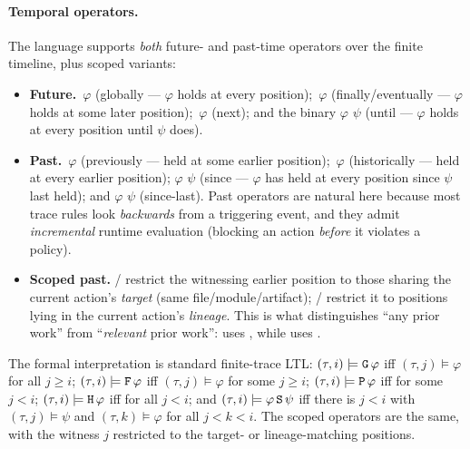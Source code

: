 \paragraph{Temporal operators.}
The language supports \emph{both} future- and past-time operators over the
finite timeline, plus scoped variants:
\begin{itemize}
\item \textbf{Future.} \,\(\varphi\) (globally --- \(\varphi\) holds at
every position); \,\(\varphi\) (finally/eventually --- \(\varphi\) holds
at some later position); \,\(\varphi\) (next); and the binary
\(\varphi\)\,\,\(\psi\) (until --- \(\varphi\) holds at every position
until \(\psi\) does).
\item \textbf{Past.} \,\(\varphi\) (previously --- held at some earlier
position); \,\(\varphi\) (historically --- held at every earlier
position); \(\varphi\)\,\,\(\psi\) (since --- \(\varphi\) has held at
every position since \(\psi\) last held); and \(\varphi\)\,\,\(\psi\)
(since-last). Past operators are natural here because most trace rules look
\emph{backwards} from a triggering event, and they admit \emph{incremental}
runtime evaluation (blocking an action \emph{before} it violates a policy).
\item \textbf{Scoped past.} / restrict the
witnessing earlier position to those sharing the current action's \emph{target}
(same file/module/artifact); / restrict it to
positions lying in the current action's  \emph{lineage}. This
is what distinguishes ``any prior work'' from ``\emph{relevant} prior work'':
 uses , while
 uses .
\end{itemize}

\noindent The formal interpretation is standard finite-trace LTL:
\((\tau, i) \models \code{G}\,\varphi\) iff \((\tau, j) \models \varphi\) for all
\(j \ge i\); \((\tau, i) \models \code{F}\,\varphi\) iff \((\tau, j) \models
\varphi\) for some \(j \ge i\); \((\tau, i) \models \code{P}\,\varphi\) iff for
some \(j < i\); \((\tau, i) \models \code{H}\,\varphi\) iff for all \(j < i\); and
\((\tau, i) \models \varphi\,\code{S}\,\psi\) iff there is \(j < i\) with
\((\tau, j) \models \psi\) and \((\tau, k) \models \varphi\) for all
\(j < k < i\). The scoped operators are the same, with the witness \(j\)
restricted to the target- or lineage-matching positions.

